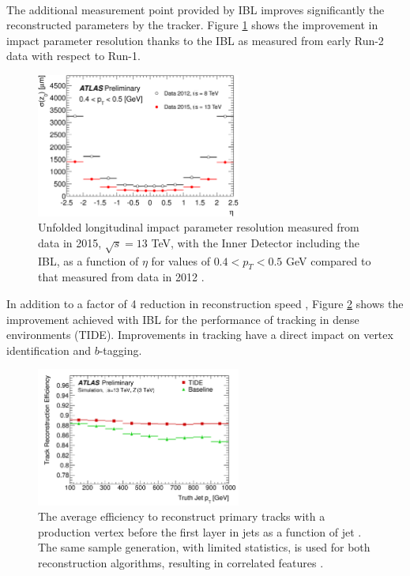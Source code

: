 \\
The additional measurement point provided by IBL improves significantly the reconstructed parameters by the tracker. Figure \ref{fig:chap2:ATLAS:ITK:IBL:Imp} shows the improvement in impact parameter resolution thanks to the IBL as measured from early Run-2 data with respect to Run-1. 
\begin{figure}[htbp]
    \centering
    \includegraphics[width=0.6\textwidth]{Ch2/Img/IBL_impact.png}
    \caption{Unfolded longitudinal impact parameter resolution measured from data in 2015, $\sqrt{s}= 13$ TeV, with the Inner Detector including the IBL, as a function of $\eta$  for values of $0.4 < p_{T} < 0.5$ GeV compared to that measured from data in 2012 \cite{IBL_IP}.}
    \label{fig:chap2:ATLAS:ITK:IBL:Imp}
\end{figure}
In addition to a factor of 4 reduction in reconstruction speed \cite{IBL_Time}, Figure \ref{fig:chap2:ATLAS:ITK:IBL:Trk} shows the improvement achieved with IBL for the performance of tracking in dense environments (TIDE). Improvements in tracking have a direct impact on vertex identification and $b$-tagging. 
\begin{figure}[htbp]
    \centering
    \includegraphics[width=0.6\textwidth]{Ch2/Img/IBL_track.png}
    \caption{The average efficiency to reconstruct primary tracks with a production vertex before the first layer in jets as a function of jet \pT. The same sample generation, with limited statistics, is used for both reconstruction algorithms, resulting in correlated features \cite{IBL_Trk}.}
    \label{fig:chap2:ATLAS:ITK:IBL:Trk}
\end{figure}
